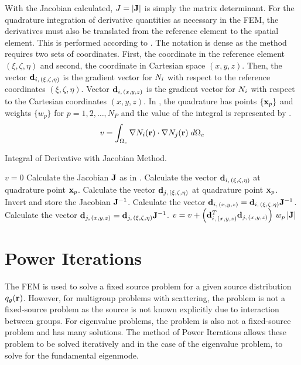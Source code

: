    With the Jacobian calculated, $J=\lvert\mathbf{J}\rvert$ is simply the matrix 
    determinant. For the quadrature integration of derivative quantities as
    necessary in the FEM, the derivatives must also be translated from the
    reference element to the spatial element. This is performed according to 
    . The notation is dense as the method
    requires two sets of coordinates. First, the coordinate in the reference
    element $(\xi,\zeta,\eta)$ and second, the coordinate in Cartesian space
    $(x,y,z)$.
    Then, the vector $\mathbf{d}_{i,\,(\xi,\zeta,\eta)}$ is the gradient vector for
    $N_i$ with respect to the reference coordinates $(\xi,\zeta,\eta)$.
    Vector $\mathbf{d}_{i,\,(x,y,z)}$ is the gradient vector for $N_i$ with
    respect to the Cartesian coordinates $(x,y,z)$. In 
    , the quadrature has points $\{\mathbf{x}_p\}$ and 
    weights $\{w_p\}$ for $p = 1,2,\ldots,N_P$ and the value of the integral is
    represented by .
    \begin{equation}
      \label{eq:deriv_integral}
      v = \int_{\Omega_e} \mathbf{\nabla} N_i(\mathbf{r}) \cdot \mathbf{\nabla} N_j(\mathbf{r}) \;
      d\Omega_e
    \end{equation}

    \begin{algorithm}
      \caption{Integral of Derivative with Jacobian Method.}
      \label{algorithm:deriv_int}
      \begin{algorithmic}[1]
        \State $v=0$
          \State Calculate the Jacobian $\mathbf{J}$ as in .
          \State Calculate the vector $\mathbf{d}_{i,\,(\xi,\zeta,\eta)}$ at quadrature
            point $\mathbf{x}_p$.
          \State Calculate the vector $\mathbf{d}_{j,\,(\xi,\zeta,\eta)}$ at quadrature
            point $\mathbf{x}_p$.
          \State Invert and store the Jacobian $\mathbf{J}^{-1}$.
          \State Calculate the vector $\mathbf{d}_{i,\,(x,y,z)} =
            \mathbf{d}_{i,\,(\xi,\zeta,\eta)} \mathbf{J}^{-1}$.
          \State Calculate the vector $\mathbf{d}_{j,\,(x,y,z)} =
            \mathbf{d}_{j,\,(\xi,\zeta,\eta)} \mathbf{J}^{-1}$.
          \State $v = v + \left(\mathbf{d}_{i,\,(x,y,z)}^{T} \mathbf{d}_{j,\,(x,y,z)}\right)
            \, w_p \, \lvert \mathbf{J} \rvert$
        \EndFor
      \end{algorithmic}
    \end{algorithm}

\section{Power Iterations}
  \label{sec:power_iterations}
  The FEM is used to solve a fixed source problem for a given source
  distribution $q_g(\mathbf{r})$. However, for multigroup problems with scattering, 
  the problem is not a fixed-source problem as the source is not known
  explicitly due to interaction between groups. For eigenvalue problems, the
  problem is also not a fixed-source problem and has many solutions. The method 
  of Power Iterations allows these problem to be solved iteratively and in the
  case of the eigenvalue problem, to solve for the fundamental eigenmode.

